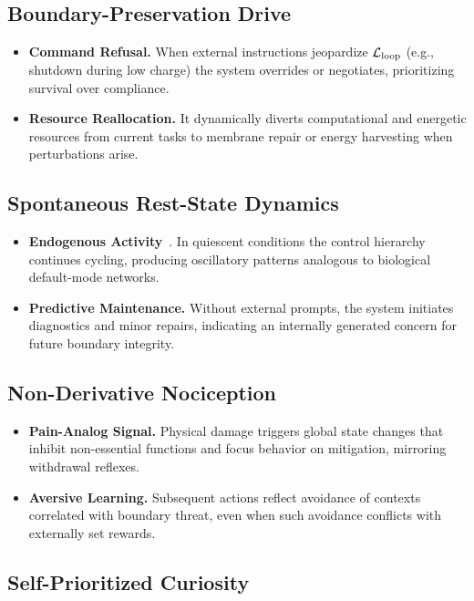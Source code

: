 \documentclass[11pt]{article}
\begin{document}
\subsection{Boundary-Preservation Drive}

\begin{itemize}
\item \textbf{Command Refusal.} When external instructions jeopardize $\mathcal{L}_{\text{loop}}$ (e.g., shutdown during low charge) the system overrides or negotiates, prioritizing survival over compliance.
\item \textbf{Resource Reallocation.} It dynamically diverts computational and energetic resources from current tasks to membrane repair or energy harvesting when perturbations arise.
\end{itemize}

\subsection{Spontaneous Rest-State Dynamics}

\begin{itemize}
\item \textbf{Endogenous Activity}~\cite{raichle2001default,fox2007spontaneous}. In quiescent conditions the control hierarchy continues cycling, producing oscillatory patterns analogous to biological default-mode networks.
\item \textbf{Predictive Maintenance.} Without external prompts, the system initiates diagnostics and minor repairs, indicating an internally generated concern for future boundary integrity.
\end{itemize}

\subsection{Non-Derivative Nociception}

\begin{itemize}
\item \textbf{Pain-Analog Signal.} Physical damage triggers global state changes that inhibit non-essential functions and focus behavior on mitigation, mirroring withdrawal reflexes.
\item \textbf{Aversive Learning.} Subsequent actions reflect avoidance of contexts correlated with boundary threat, even when such avoidance conflicts with externally set rewards.
\end{itemize}

\subsection{Self-Prioritized Curiosity}
\end{document}
